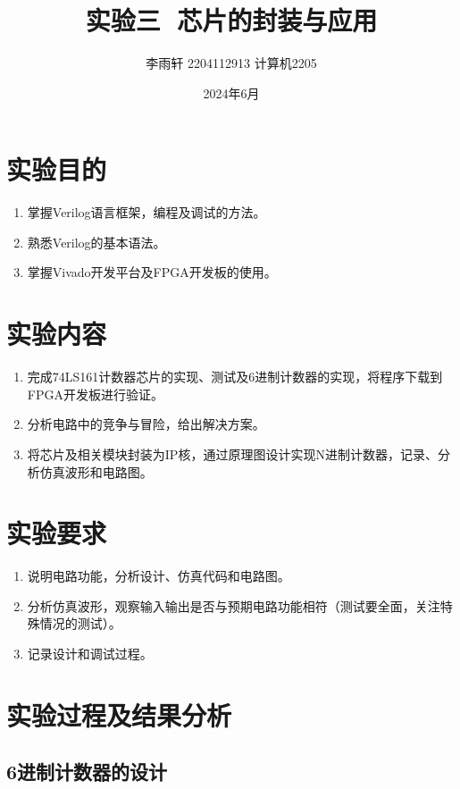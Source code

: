 \documentclass[a4,10pt,zihao=-4]{ctexart}
\begin{document}
\title{实验三\,\,\,\,芯片的封装与应用}

\author{李雨轩 2204112913 计算机2205}
\date{2024年6月}
\maketitle

\section{实验目的}
\begin{enumerate}
  \item 掌握Verilog语言框架，编程及调试的方法。
  \item 熟悉Verilog的基本语法。
  \item 掌握Vivado开发平台及FPGA开发板的使用。
\end{enumerate}

\section{实验内容}
\begin{enumerate}   
  \item 完成74LS161计数器芯片的实现、测试及6进制计数器的实现，将程序下载到FPGA开发板进行验证。
  \item 分析电路中的竞争与冒险，给出解决方案。
  \item 将芯片及相关模块封装为IP核，通过原理图设计实现N进制计数器，记录、分析仿真波形和电路图。
\end{enumerate}

\section{实验要求}
\begin{enumerate}
  \item 说明电路功能，分析设计、仿真代码和电路图。
  \item 分析仿真波形，观察输入输出是否与预期电路功能相符（测试要全面，关注特殊情况的测试）。
  \item 记录设计和调试过程。
\end{enumerate}


\newpage
\section{实验过程及结果分析}
\subsection{6进制计数器的设计}
\end{document}
